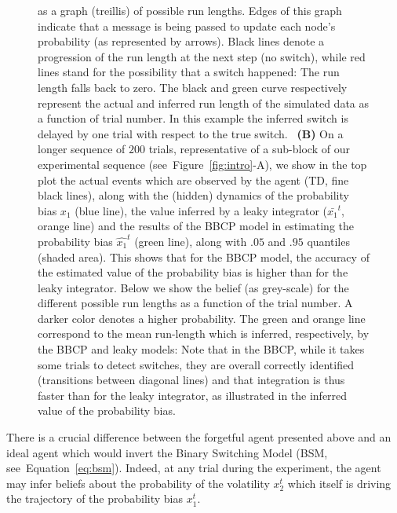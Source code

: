 \documentclass[12pt,english]{article}%
\newcommand{\seeFig}[1]{Figure~\ref{fig:#1}}
\newcommand{\seeEq}[1]{Equation~\ref{eq:#1}}
\newcommand{\AM}[1]{\textbf{\textcolor{blue}{[AM: #1]}}}
\begin{document}
\begin{figure}
{{as a graph (treillis) of possible run lengths.
Edges of this graph indicate that a message is being passed
to update each node's probability (as represented by arrows).
Black lines denote a progression of the run length at the next step (no switch),
while red lines stand for the possibility that a switch happened:
The run length falls back to zero.
The black and green curve respectively represent
the actual and inferred run length of the simulated data
as a function of trial number.
In this example the inferred switch is delayed
by one trial with respect to the true switch.}
~\textbf{(B)} On a longer sequence of $200$ trials,
representative of a sub-block of our experimental sequence (see~\seeFig{intro}-A), %
we show in the top plot
the actual events which are observed by the agent (TD, fine black lines),
along with the (hidden) dynamics of the probability bias $x_1$ (blue line),
the value inferred by a leaky integrator ($\bar{x_1}^t$, orange line)
and the results of the BBCP model
in estimating the probability bias $\hat{x_1}^t$ (green line),
along with $.05$ and $.95$ quantiles (shaded area).
This shows that for the BBCP model,
the accuracy of the estimated value of the probability bias
is higher than for the leaky integrator.
Below we show the belief (as grey-scale) for the different possible run lengths
as a function of the trial number.
A darker color denotes a higher probability.
The green and orange line correspond to the mean run-length which is inferred,
respectively, by the BBCP and leaky models:
Note that in the BBCP, while it takes some trials to detect switches,
they are overall correctly identified (transitions between diagonal lines) and
that integration is thus faster than for the leaky integrator, 
as illustrated in the inferred value of the probability bias.
}
\label{fig:bayesianchangepoint}
\end{figure}
There is a crucial difference between the forgetful agent presented above
and an ideal agent which would invert the Binary Switching Model (BSM, see~\seeEq{bsm}).
Indeed, at any trial during the experiment,
the agent may infer beliefs about the probability of the volatility $x_2^t$
which itself is driving the trajectory of the probability bias $x_1^t$.
\end{document}
